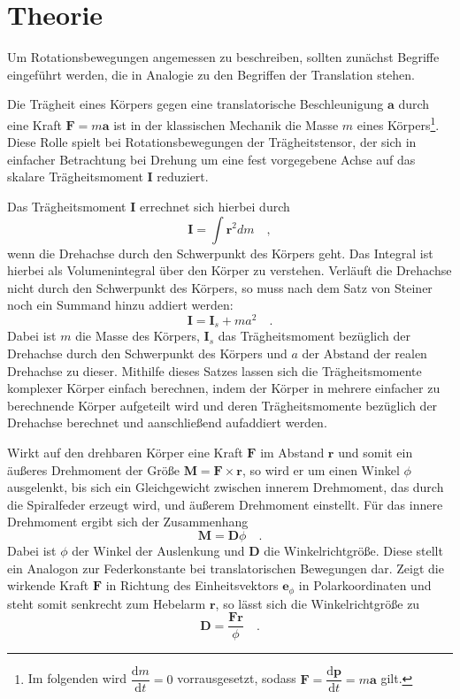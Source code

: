 \section{Theorie}
\label{sec:Theorie}
Um Rotationsbewegungen angemessen zu beschreiben, sollten zunächst Begriffe
eingeführt werden, die in Analogie zu den Begriffen der Translation stehen.

Die Trägheit eines Körpers gegen eine translatorische Beschleunigung $\symbf{a}$
durch eine Kraft $\symbf{F}=m\symbf{a}$ ist in der klassischen Mechanik die
Masse $m$ eines Körpers\footnote{Im folgenden wird
$\dfrac{\mathrm{d}m}{\mathrm{d}t}=0$ vorrausgesetzt, sodass
$\symbf{F}=\dfrac{\mathrm{d}\symbf{p}}{\mathrm{d}t}=m\symbf{a}$ gilt.}.
Diese Rolle spielt bei Rotationsbewegungen der Trägheitstensor, der sich in
einfacher Betrachtung bei Drehung um eine fest vorgegebene Achse auf das skalare
Trägheitsmoment $\symbf{I}$ reduziert.

Das Trägheitsmoment $\symbf{I}$ errechnet sich hierbei durch
\begin{equation}
  \symbf{I}=\int \symbf{r}^2 dm\quad,
  \label{eqn:traegheitallg}
\end{equation}
wenn die Drehachse durch den Schwerpunkt des Körpers geht. Das Integral ist hierbei
als Volumenintegral über den Körper zu verstehen. Verläuft die Drehachse nicht
durch den Schwerpunkt des Körpers, so muss nach dem Satz von Steiner noch ein
Summand hinzu addiert werden:
\begin{equation}
  \symbf{I}=\symbf{I}_s+ma^2\quad.
  \label{eqn:steiner}
\end{equation}
Dabei ist $m$ die Masse des Körpers, $\symbf{I}_s$ das Trägheitsmoment bezüglich
der Drehachse durch den Schwerpunkt des Körpers und $a$ der Abstand der realen
Drehachse zu dieser. Mithilfe dieses Satzes lassen sich die Trägheitsmomente
komplexer Körper einfach berechnen, indem der Körper in mehrere einfacher zu berechnende
Körper aufgeteilt wird und deren Trägheitsmomente bezüglich der Drehachse berechnet
und aanschließend aufaddiert werden.

Wirkt auf den drehbaren Körper eine Kraft $\symbf{F}$ im Abstand $\symbf{r}$ und somit ein
äußeres Drehmoment der Größe $\symbf{M}=\symbf{F}\times\symbf{r}$, so wird er um
einen Winkel $\phi$ ausgelenkt, bis sich ein Gleichgewicht zwischen innerem Drehmoment,
das durch die Spiralfeder erzeugt wird, und äußerem Drehmoment einstellt. Für das innere
Drehmoment ergibt sich der Zusammenhang
\begin{equation}
  \symbf{M}=\symbf{D}\phi\quad.
  \label{eqn:drehmoment_innen}
\end{equation}
Dabei ist $\phi$ der Winkel der Auslenkung und $\symbf{D}$ die Winkelrichtgröße.
Diese stellt ein Analogon zur Federkonstante bei translatorischen Bewegungen dar.
Zeigt die wirkende Kraft $\symbf{F}$ in Richtung des Einheitsvektors $\symbf{e}_{\phi}$
in Polarkoordinaten und steht somit senkrecht zum Hebelarm $\symbf{r}$, so lässt sich
die Winkelrichtgröße zu
\begin{equation}
  \symbf{D}=\frac{\symbf{F}\symbf{r}}{\phi}\quad.
  \label{eqn:winkelrg}
\end{equation}

